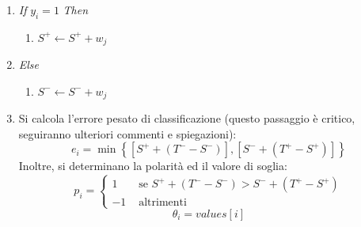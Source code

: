 \begin{enumerate}
\begin{enumerate}
\begin{enumerate}
                        \item \emph{If} $y_i = 1$ \emph{Then}
                        \begin{enumerate}
                            \item $S^+ \leftarrow S^+ + w_j$
                        \end{enumerate}
                        \item \emph{Else}
                        \begin{enumerate}
                            \item $S^- \leftarrow S^- + w_j$
                        \end{enumerate}

                        \item \label{best_classifier_p_theta}
                        Si calcola l'errore pesato di classificazione (questo passaggio è critico, seguiranno ulteriori commenti e spiegazioni):
                        \begin{equation}
                            \label{subeq:weighted_error_calculus}
                            e_i = \min\left\{ \left[S^+ + (T^- - S^-)\right], \left[S^- + (T^+ - S^+)\right] \right\}
                        \end{equation}
                        Inoltre, si determinano la polarità ed il valore di soglia:
                        \begin{equation}
                            \label{subeq:polarity_assignment}
                            p_i = 
                            \begin{cases}
                                1 & \text{ se } S^+ + (T^- - S^-) > S^- + (T^+ - S^+) \\
                                -1 & \text{ altrimenti }
                            \end{cases}
                        \end{equation}
                        \begin{equation}
                            \label{subeq:threshold_assignment}
                            \theta_i = values[i]
                        \end{equation}

                    \end{enumerate}


\end{enumerate}
\end{enumerate}
